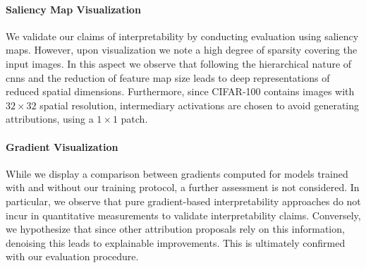 \paragraph{Saliency Map Visualization} We validate our claims of interpretability by 
conducting evaluation using saliency maps. However, upon visualization we note a high degree of 
sparsity covering the input images. In this aspect we observe that following the hierarchical nature 
of \glspl{cnn} and the reduction of feature map size leads to deep representations of reduced 
spatial dimensions. Furthermore, since CIFAR-100 contains images with $32\times32$ spatial 
resolution, intermediary activations are chosen to avoid generating attributions, using a 
$1\times1$ patch.

\paragraph{Gradient  Visualization} While we display a comparison between gradients 
computed for models trained with and without our training protocol, a further assessment is not 
considered. In particular, we observe that pure gradient-based interpretability approaches do not 
incur in quantitative measurements to validate interpretability claims. Conversely, we hypothesize 
that since other attribution proposals rely on this information, denoising this leads to 
explainable improvements. This is ultimately confirmed with our evaluation procedure.